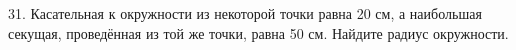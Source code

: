 31. Касательная к окружности из некоторой точки равна 20 см, а наибольшая секущая, проведённая из той же точки, равна 50 см. Найдите радиус окружности.\\
